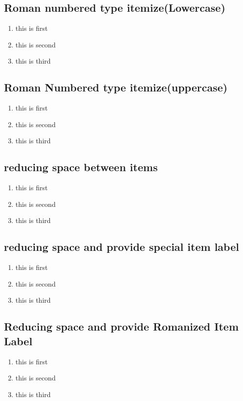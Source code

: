 \documentclass{article}
\begin{document}
\subsection{Roman numbered type itemize(Lowercase)}
\begin{enumerate}[i]
\item this is first
\item this is second
\item this is third
\end{enumerate}

\subsection{Roman Numbered type itemize(uppercase)}
\begin{enumerate}[I]
\item this is first
\item this is second
\item this is third
\end{enumerate}

\subsection{reducing space between items}
\begin{enumerate}[nosep]
\item this is first
\item this is second
\item this is third
\end{enumerate}
\subsection{reducing space and provide special item label}
\begin{enumerate}[nosep,label=*]
\item this is first
\item this is second
\item this is third
\end{enumerate}

\subsection{Reducing space and provide Romanized Item Label}
\begin{enumerate}[nosep,label=\roman*]
\item this is first
\item this is second
\item this is third
\end{enumerate}
\end{document}
